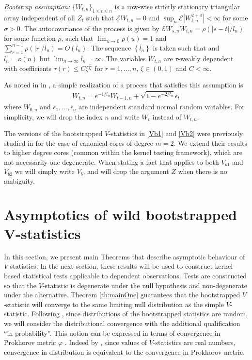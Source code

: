 \documentclass{article} %
\newcommand{\ev}{\mathcal{E}}
\begin{document}
\emph{Bootstrap assumption:} $\{W_{t,n}\}_{1 \leq t \leq n }$ is a row-wise strictly stationary triangular array independent of all $Z_t$ such that $\ev W_{t,n}=0$ and $\sup_{n} \ev|W_{t,n}^{2+\sigma}| < \infty$ for some $\sigma > 0$. The autocovariance of the process is given by $\ev W_{s,n} W_{t,n}=\rho(|s-t|/l_n)$ for some function $\rho$, such that $\lim_{u \to 0} \rho(u) = 1$ and $\sum_{r=1}^{n-1} \rho(|r|/l_n)= O(l_n)$. The sequence $\left\{l_n\right\}$ is taken such that and $l_n=o(n)$ but $\lim_{n \to \infty} l_n = \infty$. The variables $W_{t,n}$  are $\tau$-weakly dependent with coefficients $\tau(r) \leq C \zeta^{\frac{r} {l_n}}$ for $r=1,...,n$, $\zeta \in (0,1)$ and $C<\infty$.

As noted in in \cite[Remark 2]{leucht_dependent_2013}, a simple realization of a process that satisfies this assumption is 
\begin{align}
W_{t,n} = e^{-1/l_n}W_{t-1,n} + \sqrt{1 -e^{-2/l_n}} \epsilon_t \label{OU-wild}
\end{align}
where $W_{0,n}$ and $\epsilon_1,\ldots,\epsilon_n$ are independent standard normal random variables. For simplicity, we will drop the index $n$ and write $W_t$ instead of $W_{t,n}$. 

The versions of the bootstrapped $V$-statistics in \eqref{Vb1} and \eqref{Vb2} were previously studied in \cite{leucht_dependent_2013} for the case of canonical cores of degree $m=2$. We extend their results to higher degree cores (common within the kernel testing framework), which are not necessarily one-degenerate. When stating a fact that applies to both $V_{b1}$ and $V_{b2}$ we will simply write $V_b$, and will drop the argument $Z$ when there is no ambiguity. 
\vspace{-3mm}
\section{Asymptotics of wild bootstrapped V-statistics}\label{sec:main}
\vspace{-3mm}
In this section, we present main Theorems that describe asymptotic behaviour of $V$-statistics. In the next section, these results will be used to construct kernel-based statistical tests applicable to dependent observations. Tests are constructed so that the  $V$-statistic is degenerate under the null hypothesis and non-degenerate under the alternative. Theorem \ref{th:mainOne} guarantees that the bootstrapped $V$-statistic will converge to the same limiting null distribution as the simple $V$-statistic. Following \cite{leucht_dependent_2013}, since distributions of the bootstrapped statistics are random, we will consider the distributional convergence with the additional qualification ``in probability''. This notion can be  expressed  in terms of convergence in Prokhorov metric $\varphi$ \cite[Section 11.3]{dudley2002real}. Indeed by \cite[Theorem 11.3.3]{dudley2002real}, since values of $V$-statistics are real numbers, convergence in distribution is equivalent to the convergence in Prokhorov metric. 
\end{document}

